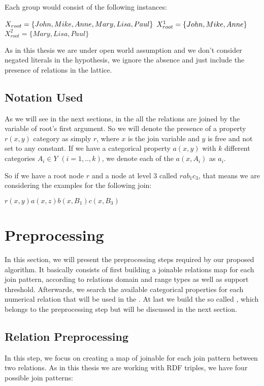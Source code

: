 Each group would consist of the following instances:

$X_{root}=\{John,Mike,Anne,Mary,Lisa,Paul\} \\$
$X_{root}^1=\{John,Mike,Anne\} \\$
$X_{root}^2=\{Mary,Lisa,Paul\}$

As in this thesis we are under open world assumption and we don't consider negated literals in the hypothesis, we ignore
the absence and just include the presence of relations in the lattice.


\subsection{Notation Used}

As we will see in the next sections, in the \graphname all the relations are joined by the variable of root's first
argument. So we will denote the presence of a property $r(x,y)$ category as simply $r$, where $x$ is the join variable
and $y$ is free and not set to any constant. If we have a categorical property $a(x,y)$ with $k$ different categories
$A_i \in Y$ $(i=1,..,k)$, we denote each of the $a(x,A_i)$ as $a_i$.

So if we have a root node $r$ and a node at level 3 called $rab_1c_3$, that means we are considering the examples for
the following join:

$r(x,y)a(x,z)b(x,B_1)c(x,B_3)$


\section{Preprocessing}

In this section, we will present the preprocessing steps required by our proposed algorithm. It basically consists of
first building a joinable relations map for each join pattern, according
to relations domain and range types as well as support threshold. Afterwards, we search the available categorical
properties for each numerical relation that will be used in the \graphname. At last we build the so called \graphname,
which belongs to the preprocessing step but will be discussed in the next section.

\subsection{Relation Preprocessing}

In this step, we focus on creating a map of joinable for each join pattern between two relations. As in this thesis we
are working with RDF triples, we have four possible join patterns:


